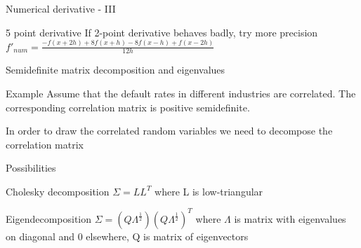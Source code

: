 \documentclass[presentation]{beamer}
\begin{document}
\begin{frame}[label=sec-2-3]{Numerical derivative - III}
\begin{block}{5 point derivative}
If 2-point derivative behaves badly, try more precision
$f'_{num} = \frac{-f(x+2h) + 8f(x+h) - 8f(x-h) + f(x-2h)}{12h}$
\end{block}
\end{frame}
\begin{frame}[label=sec-2-4]{Semidefinite matrix decomposition and eigenvalues}
\begin{block}{Example}
Assume that the default rates in different industries are correlated. The corresponding correlation matrix is positive semidefinite.
\end{block}
\begin{block}{In order to draw the correlated random variables we need to decompose the correlation matrix}
\end{block}
\begin{block}{Possibilities}
\begin{block}{Cholesky decomposition}
$\Sigma = LL^T$ where L is low-triangular
\end{block}
\begin{block}{Eigendecomposition}
$\Sigma = (Q\Lambda^{\frac{1}{2}})(Q\Lambda^{\frac{1}{2}})^T$ where $\Lambda$ is matrix with eigenvalues on diagonal and 0 elsewhere, Q is matrix of eigenvectors
\end{block}
\end{block}
\end{frame}
\end{document}

